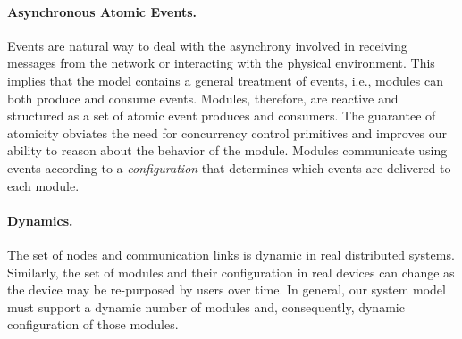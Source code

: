 \documentclass[letterpaper]{article}
\begin{document}
\paragraph{Asynchronous Atomic Events.}
Events are natural way to deal with the asynchrony involved in receiving messages from the network or interacting with the physical environment.
This implies that the model contains a general treatment of events, i.e., modules can both produce and consume events.
Modules, therefore, are reactive and structured as a set of atomic event produces and consumers.
The guarantee of atomicity obviates the need for concurrency control primitives and improves our ability to reason about the behavior of the module.
Modules communicate using events according to a \emph{configuration} that determines which events are delivered to each module.


\paragraph{Dynamics.}
The set of nodes and communication links is dynamic in real distributed systems.
Similarly, the set of modules and their configuration in real devices can change as the device may be re-purposed by users over time.
In general, our system model must support a dynamic number of modules and, consequently, dynamic configuration of those modules.
\end{document}
